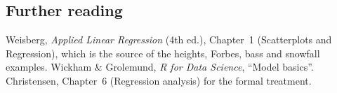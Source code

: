 \subsection{Further reading}
Weisberg, \emph{Applied Linear Regression} (4th ed.), Chapter~1 (Scatterplots and Regression),
which is the source of the heights, Forbes, bass and snowfall examples. Wickham \& Grolemund,
\emph{R for Data Science}, ``Model basics''. Christensen, Chapter~6 (Regression analysis) for
the formal treatment.
